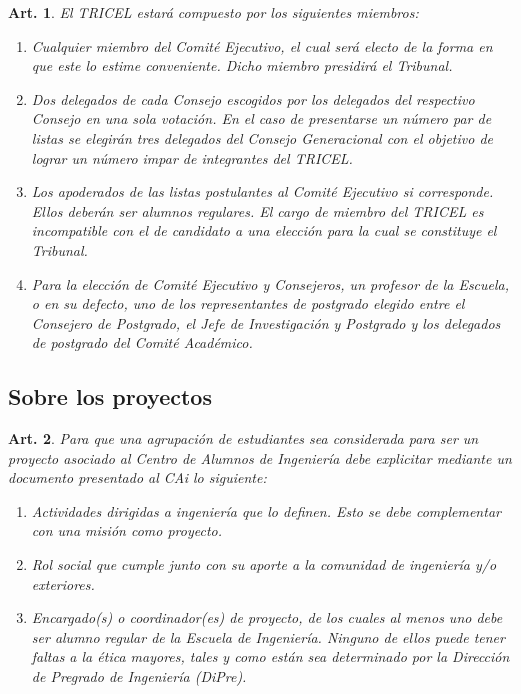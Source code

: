 \documentclass[letterpaper,11pt]{article}
\theoremstyle{plain}
\newtheorem{art}{Art.} %
\begin{document}
			\begin{art}\label{composicionTRICEL}
				El TRICEL estará compuesto por los siguientes miembros:
				\begin{enumerate}
					\item Cualquier miembro del Comité Ejecutivo, el cual será electo de la forma en que este lo estime conveniente. Dicho miembro presidirá el Tribunal.
					\item Dos delegados de cada  Consejo escogidos por los delegados del respectivo Consejo en una sola votación. En el caso de presentarse un número par de listas se elegirán tres delegados del Consejo Generacional con el objetivo de lograr un número impar de integrantes del TRICEL.
					\item Los apoderados de las listas postulantes al Comité Ejecutivo si corresponde. Ellos deberán ser alumnos regulares. El cargo de miembro del TRICEL es incompatible con el de candidato a una elección para la cual se constituye el Tribunal.
					\item Para la elección de Comité Ejecutivo y Consejeros, un profesor de la Escuela, o en su defecto, uno de los representantes de postgrado elegido entre el Consejero de Postgrado, el Jefe de Investigación y Postgrado y los delegados de postgrado del Comité Académico.
				\end{enumerate}
			\end{art}

		\subsection*{Sobre los proyectos}

			\begin{art}
				Para que una agrupación de estudiantes sea considerada para ser un proyecto asociado al Centro de Alumnos de Ingeniería debe explicitar mediante un documento presentado al CAi lo siguiente:

				\begin{enumerate}
					\item Actividades dirigidas a ingeniería que lo definen. Esto se debe complementar con una misión como proyecto.
					\item Rol social que cumple junto con su aporte a la comunidad de ingeniería y/o exteriores.
					\item Encargado(s) o coordinador(es) de proyecto, de los cuales al menos uno debe ser alumno regular de la Escuela de Ingeniería. Ninguno de ellos puede tener faltas a la ética mayores, tales y como están sea determinado por la Dirección de Pregrado de Ingeniería (DiPre).
				\end{enumerate}

			\end{art}
\end{document}
